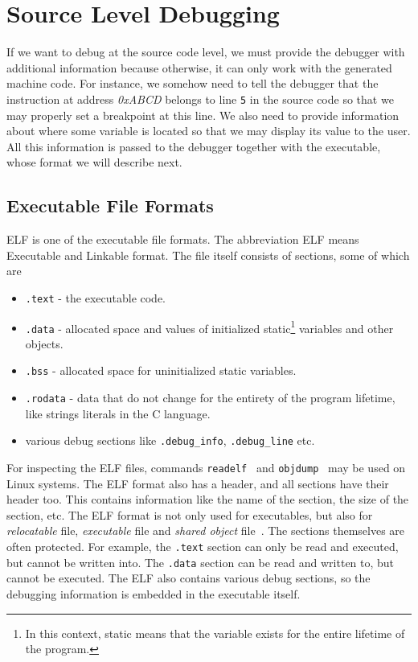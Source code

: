 \section{Source Level Debugging}\label{section:source-level-debugging}
If we want to debug at the source code level, we must provide the debugger with
additional information because otherwise, it can only work with the generated
machine code. For instance, we somehow need to tell the debugger that the
instruction at address \textit{0xABCD} belongs to line \texttt{5} in the source
code so that we may properly set a breakpoint at this line. We also need to
provide information about where some variable is located so that we may display
its value to the user. All this information is passed to the debugger together
with the executable, whose format we will describe next.

\subsection{Executable File Formats}\label{section:elf}
ELF is one of the executable file formats. The abbreviation ELF means
Executable and Linkable format. The file itself consists of sections, some of
which are
\begin{itemize}
    \item \texttt{.text} - the executable code.
    \item \texttt{.data} - allocated space and values of initialized
        static\footnote{In this context, static means that the variable exists
        for the entire lifetime of the program.} variables and other objects.
    \item \texttt{.bss} - allocated space for uninitialized static variables.
    \item \texttt{.rodata} - data that do not change for the entirety of the
        program lifetime, like strings literals in the C language.
    \item various debug sections like \verb|.debug_info|, \verb|.debug_line|
        etc.
\end{itemize}
For inspecting the ELF files, commands \texttt{readelf}~\cite{readelf} and
\texttt{objdump}~\cite{objdump} may be used on Linux systems. The ELF format
also has a header, and all sections have their header too. This contains
information like the name of the section, the size of the section, etc. The ELF
format is not only used for executables, but also for \textit{relocatable}
file, \textit{executable} file and \textit{shared object} file~\cite{elf}. The
sections themselves are often protected. For example, the \texttt{.text}
section can only be read and executed, but cannot be written into. The
\texttt{.data} section can be read and written to, but cannot be executed. The
ELF also contains various debug sections, so the debugging information is
embedded in the executable itself.

